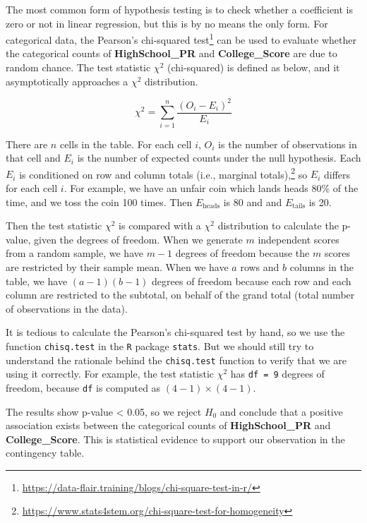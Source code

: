 \documentclass[
]{article}
\begin{document}
The most common form of hypothesis testing is to check whether a
coefficient is zero or not in linear regression, but this is by no means
the only form. For categorical data, the Pearson's chi-squared
test\footnote{\url{https://data-flair.training/blogs/chi-square-test-in-r/}}
can be used to evaluate whether the categorical counts of
\textbf{HighSchool\_PR} and \textbf{College\_Score} are due to random
chance. The test statistic \(\chi^2\) (chi-squared) is defined as below,
and it asymptotically approaches a \(\chi^2\) distribution.

\begin{equation}
\label{eqn:chi-squared-test}
\chi^2 = \sum^{n}_{i=1}\dfrac{(O_i - E_i)^2}{E_i}
\end{equation}

There are \(n\) cells in the table. For each cell \(i\), \(O_i\) is the
number of observations in that cell and \(E_i\) is the number of
expected counts under the null hypothesis. Each \(E_i\) is conditioned
on row and column totals (i.e., marginal totals),\footnote{\url{https://www.stats4stem.org/chi-square-test-for-homogeneity}}
so \(E_i\) differs for each cell \(i\). For example, we have an unfair
coin which lands heads 80\% of the time, and we toss the coin 100 times.
Then \(E_{\text{heads}}\) is 80 and and \(E_{\text{tails}}\) is 20.

Then the test statistic \(\chi^2\) is compared with a \(\chi^2\)
distribution to calculate the p-value, given the degrees of freedom.
When we generate \(m\) independent scores from a random sample, we have
\(m-1\) degrees of freedom because the \(m\) scores are restricted by
their sample mean. When we have \(a\) rows and \(b\) columns in the
table, we have \((a-1)(b-1)\) degrees of freedom because each row and
each column are restricted to the subtotal, on behalf of the grand total
(total number of observations in the data).

It is tedious to calculate the Pearson's chi-squared test by hand, so we
use the function \texttt{chisq.test} in the \texttt{R} package
\texttt{stats}. But we should still try to understand the rationale
behind the \texttt{chisq.test} function to verify that we are using it
correctly. For example, the test statistic \(\chi^2\) has
\texttt{df\ =\ 9} degrees of freedom, because \texttt{df} is computed as
\((4-1)\times(4-1)\).

The results show p-value \textless{} 0.05, so we reject \(H_0\) and
conclude that a positive association exists between the categorical
counts of \textbf{HighSchool\_PR} and \textbf{College\_Score}. This is
statistical evidence to support our observation in the contingency
table.
\end{document}
